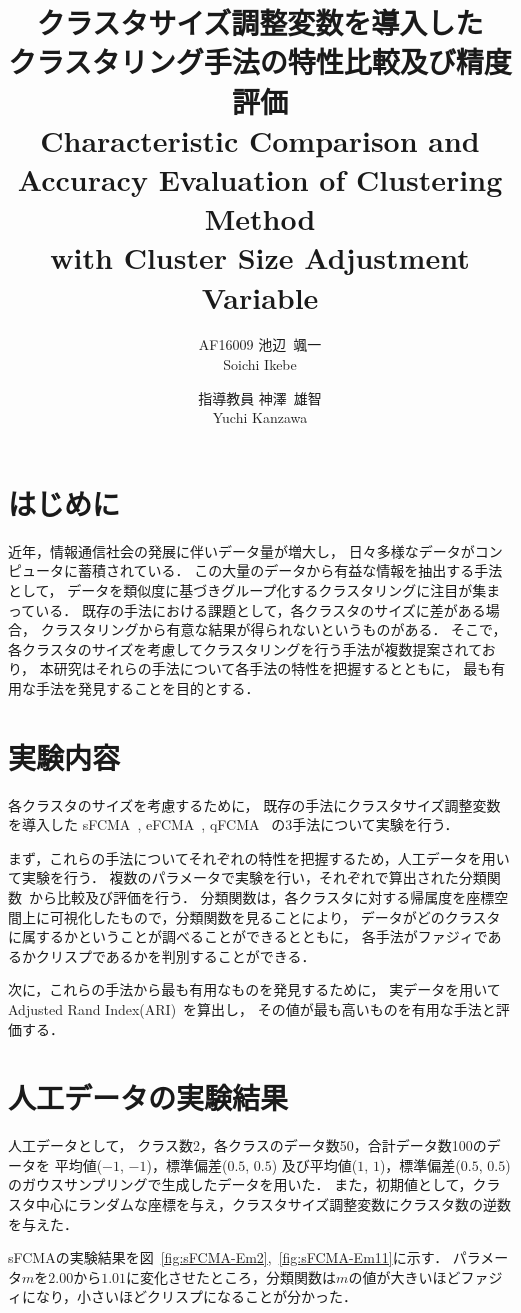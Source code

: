 \documentclass[twocolumn, a4paper]{icethesisabst}
\title{{\bf クラスタサイズ調整変数を導入した \\ クラスタリング手法の特性比較及び精度評価}
  {\normalsize \\ Characteristic Comparison and Accuracy Evaluation of Clustering Method \\ with Cluster Size Adjustment Variable}}
\author{
    AF16009 池辺~颯一 \\ Soichi Ikebe \and
    指導教員 神澤~雄智 \\ Yuchi Kanzawa
  }
\begin{document}
\maketitle


\section{はじめに}
近年，情報通信社会の発展に伴いデータ量が増大し，
日々多様なデータがコンピュータに蓄積されている．
この大量のデータから有益な情報を抽出する手法として，
データを類似度に基づきグループ化するクラスタリングに注目が集まっている．
既存の手法における課題として，各クラスタのサイズに差がある場合，
クラスタリングから有意な結果が得られないというものがある．
そこで，各クラスタのサイズを考慮してクラスタリングを行う手法が複数提案されており，
本研究はそれらの手法について各手法の特性を把握するとともに，
最も有用な手法を発見することを目的とする．


\section{実験内容}
各クラスタのサイズを考慮するために，
既存の手法にクラスタサイズ調整変数を導入した
sFCMA~\cite{sFCMA}, eFCMA~\cite{eFCMA}, qFCMA~\cite{qFCMA}
の3手法について実験を行う．

まず，これらの手法についてそれぞれの特性を把握するため，人工データを用いて実験を行う．
複数のパラメータで実験を行い，それぞれで算出された分類関数~\cite{cFunc}から比較及び評価を行う．
分類関数は，各クラスタに対する帰属度を座標空間上に可視化したもので，分類関数を見ることにより，
データがどのクラスタに属するかということが調べることができるとともに，
各手法がファジィであるかクリスプであるかを判別することができる．

次に，これらの手法から最も有用なものを発見するために，
実データを用いてAdjusted Rand Index(ARI)~\cite{ARI}を算出し，
その値が最も高いものを有用な手法と評価する．


\section{人工データの実験結果}
人工データとして，
クラス数2，各クラスのデータ数50，合計データ数100のデータを
平均値($-1$, $-1$)，標準偏差($0.5$, $0.5$)
及び平均値($1$, $1$)，標準偏差($0.5$, $0.5$)
のガウスサンプリングで生成したデータを用いた．
また，初期値として，クラスタ中心にランダムな座標を与え，クラスタサイズ調整変数にクラスタ数の逆数を与えた．

sFCMAの実験結果を図~\ref{fig:sFCMA-Em2},~\ref{fig:sFCMA-Em11}に示す．
パラメータ$m$を$2.00$から$1.01$に変化させたところ，分類関数は$m$の値が大きいほどファジィになり，小さいほどクリスプになることが分かった．
\end{document}
